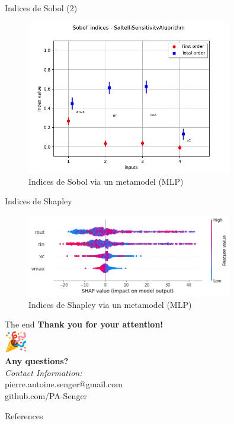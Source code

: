 \documentclass[10pt]{beamer}
\begin{document}
\begin{frame}{Indices de Sobol (2)}
  \begin{figure}
    \centering
    \includegraphics[width=0.8\textwidth]{images/sobol2.png}
    \caption{Indices de Sobol via un metamodel (MLP)}
  \end{figure}
\end{frame}

\begin{frame}{Indices de Shapley}
  \begin{figure}
    \centering
    \includegraphics[width=0.8\textwidth]{images/shapley.png}
    \caption{Indices de Shapley via un metamodel (MLP)}
  \end{figure}
\end{frame}

\begin{frame}{The end}
  \Large
  \centering
  \textbf{Thank you for your attention!} \\
  \vspace{1em}
  \includegraphics[height=1cm]{images/party-emoji.png} \\
  \vspace{1em}
  \textbf{Any questions?} \\
  \vspace{2em}
  \small
  \textit{Contact Information:} \\
  pierre.antoine.senger@gmail.com \\
  github.com/PA-Senger
\end{frame}

\begin{frame}{References}
  \printbibliography
\end{frame}
\end{document}
